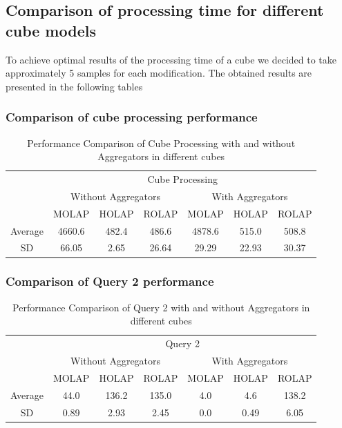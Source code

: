 \documentclass[a4paper,12pt]{article} %
\begin{document}
\newpage
\subsection{Comparison of processing time for different cube models}
To achieve optimal results of the processing time of a cube we decided to take approximately 5 samples for each modification. The obtained results are presented in the following tables

\subsubsection{Comparison of cube processing performance}

\begin{table}[H]
\centering
\caption{Performance Comparison of Cube Processing with and without Aggregators in different cubes}
\label{tab:cube_processing_performance}
\begin{tabular}{@{}lcccccc@{}}
\toprule
\multirow{3}{*}{} & \multicolumn{6}{c}{Cube Processing} \\ \cmidrule(l){2-7} 
 & \multicolumn{3}{c|}{Without Aggregators} & \multicolumn{3}{c}{With Aggregators} \\ \cmidrule(l){2-7} 
 & MOLAP & HOLAP & \multicolumn{1}{c|}{ROLAP} & MOLAP & HOLAP & ROLAP \\ \midrule
\multicolumn{1}{c|}{Average} & 4660.6 & 482.4 & \multicolumn{1}{c|}{486.6} & 4878.6 & 515.0 & 508.8 \\
\multicolumn{1}{c|}{SD} & 66.05 & 2.65 & \multicolumn{1}{c|}{26.64} & 29.29 & 22.93 & 30.37
\end{tabular}
\end{table}

\subsubsection{Comparison of Query 2 performance}

\begin{table}[H]
\centering
\caption{Performance Comparison of Query 2 with and without Aggregators in different cubes}
\label{tab:query2_processing_performance}
\begin{tabular}{@{}lcccccc@{}}
\toprule
\multirow{3}{*}{} & \multicolumn{6}{c}{Query 2} \\ \cmidrule(l){2-7} 
 & \multicolumn{3}{c|}{Without Aggregators} & \multicolumn{3}{c}{With Aggregators} \\ \cmidrule(l){2-7} 
 & MOLAP & HOLAP & \multicolumn{1}{c|}{ROLAP} & MOLAP & HOLAP & ROLAP \\ \midrule
\multicolumn{1}{c|}{Average} & 44.0 & 136.2 & \multicolumn{1}{c|}{135.0} & 4.0 & 4.6 & 138.2 \\
\multicolumn{1}{c|}{SD} & 0.89 & 2.93 & \multicolumn{1}{c|}{2.45} & 0.0 & 0.49 & 6.05
\end{tabular}
\end{table}
\end{document}
